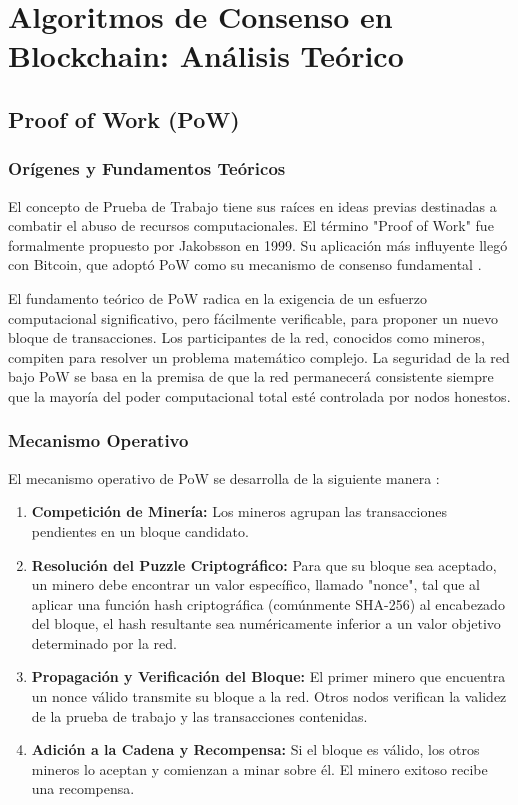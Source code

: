 \documentclass[spanish,12pt,letterpaper]{report}
\begin{document}
\section{Algoritmos de Consenso en Blockchain: Análisis Teórico}

\subsection{Proof of Work (PoW)}

\subsubsection{Orígenes y Fundamentos Teóricos}

El concepto de Prueba de Trabajo tiene sus raíces en ideas previas destinadas a combatir el abuso de recursos computacionales. El término "Proof of Work" fue formalmente propuesto por Jakobsson en 1999. Su aplicación más influyente llegó con Bitcoin, que adoptó PoW como su mecanismo de consenso fundamental \parencite{nakamoto2008bitcoin}.

El fundamento teórico de PoW radica en la exigencia de un esfuerzo computacional significativo, pero fácilmente verificable, para proponer un nuevo bloque de transacciones. Los participantes de la red, conocidos como mineros, compiten para resolver un problema matemático complejo. La seguridad de la red bajo PoW se basa en la premisa de que la red permanecerá consistente siempre que la mayoría del poder computacional total esté controlada por nodos honestos.

\subsubsection{Mecanismo Operativo}

El mecanismo operativo de PoW se desarrolla de la siguiente manera \parencite{investopedia2025pow}:

\begin{enumerate}
    \item \textbf{Competición de Minería:} Los mineros agrupan las transacciones pendientes en un bloque candidato.
    \item \textbf{Resolución del Puzzle Criptográfico:} Para que su bloque sea aceptado, un minero debe encontrar un valor específico, llamado "nonce", tal que al aplicar una función hash criptográfica (comúnmente SHA-256) al encabezado del bloque, el hash resultante sea numéricamente inferior a un valor objetivo determinado por la red.
    \item \textbf{Propagación y Verificación del Bloque:} El primer minero que encuentra un nonce válido transmite su bloque a la red. Otros nodos verifican la validez de la prueba de trabajo y las transacciones contenidas.
    \item \textbf{Adición a la Cadena y Recompensa:} Si el bloque es válido, los otros mineros lo aceptan y comienzan a minar sobre él. El minero exitoso recibe una recompensa.
\end{enumerate}
\end{document}
